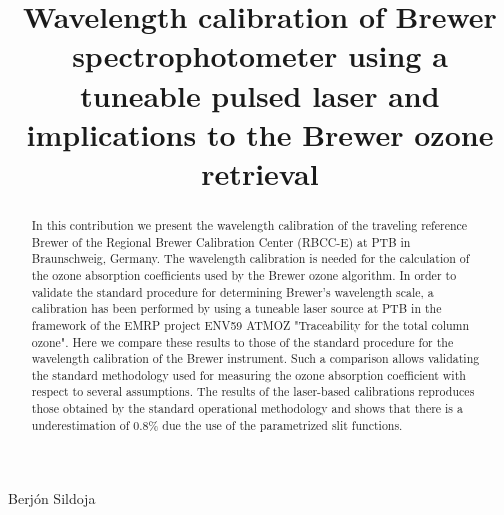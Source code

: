 \documentclass[acp]{copernicus} %
\begin{document}
\title{Wavelength calibration of Brewer spectrophotometer using a tuneable pulsed laser and implications to the Brewer ozone retrieval}


 {Berjón}
 {Sildoja}












\received{}
\pubdiscuss{} %
\revised{}
\accepted{}
\published{}




\maketitle



\begin{abstract}

In this contribution we present the wavelength calibration of the traveling reference Brewer of the Regional Brewer Calibration Center (RBCC-E)  at PTB in Braunschweig, Germany. The wavelength calibration is needed for the calculation of the ozone absorption coefficients used by the Brewer ozone algorithm. In order to validate the standard procedure for determining Brewer’s wavelength scale, a calibration has been performed by using a tuneable laser source at PTB in the framework of the EMRP project ENV59 ATMOZ "Traceability for the total column ozone". Here we compare these results to those of the standard procedure for the wavelength calibration of the Brewer instrument. Such a comparison allows validating the standard methodology used for measuring the ozone absorption coefficient with respect to several assumptions. The results of the laser-based calibrations reproduces those obtained by the standard operational methodology and shows that there is a underestimation of 0.8\%  due the use of the parametrized slit functions. 
\end{abstract}
\end{document}
